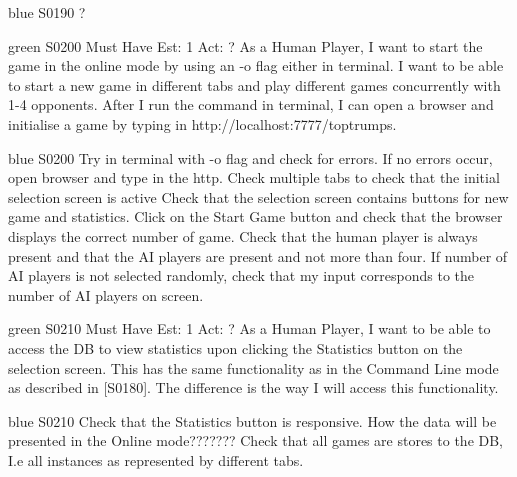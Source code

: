 \begin{card}{blue}
{S0190}{}{}{}
?
\end{card}


\newpage

\begin{card}{green}
{S0200}
{Must Have}
{Est: 1}
{Act: ?}
As a Human Player, I want to start the game in the online mode by using an -o flag either in terminal.  
I want to be able to start a new game in different tabs and play different games concurrently with 1-4 opponents. 
After I run the command in terminal, I can open a browser and initialise a game by typing in http://localhost:7777/toptrumps.
\end{card}

\begin{card}{blue}
{S0200}{}{}{}
Try in terminal with -o flag and check for errors. 
If no errors occur, open browser and type in the http.
Check multiple tabs to check that the initial selection screen is active Check that the selection screen contains buttons for new game and statistics.
Click on the Start Game button and check that the browser displays the correct number of game. 
Check that the human player is always present and that the AI players are present and not more than four. 
If number of AI players is not selected randomly, check that my input corresponds to the number of AI players on screen.
\end{card}


\newpage

\begin{card}{green}
{S0210}
{Must Have}
{Est: 1}
{Act: ?}
As a Human Player, I want to be able to access the DB to view statistics upon clicking the Statistics button on the selection screen.
This has the same functionality as in the Command Line mode as described in [S0180].
The difference is the way I will access this functionality.
\end{card}

\begin{card}{blue}
{S0210}{}{}{}
Check that the Statistics button is responsive. 
How the data will be presented in the Online mode???????
Check that all games are stores to the DB, I.e all instances as represented by different tabs.
\end{card}


